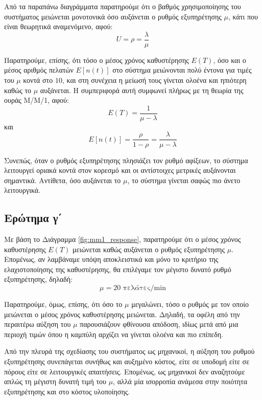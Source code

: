 \documentclass{article}
\begin{document}
Από τα παραπάνω διαγράμματα παρατηρούμε ότι ο βαθμός χρησιμοποίησης του
συστήματος μειώνεται μονοτονικά όσο αυξάνεται ο ρυθμός εξυπηρέτησης \(\mu\),
κάτι που είναι θεωρητικά αναμενόμενο, αφού:
\begin{equation}
U = \rho = \frac{\lambda}{\mu}
\end{equation}

Παρατηρούμε, επίσης, ότι τόσο ο μέσος χρόνος καθυστέρησης \(E(T)\), όσο και ο
μέσος αριθμός πελατών \(E[n(t)]\) στο σύστημα μειώνονται πολύ έντονα για τιμές
του \(\mu\) κοντά στο \(10\), και στη συνέχεια η μείωσή τους γίνεται ολοένα και
ηπιότερη καθώς το \(\mu\) αυξάνεται. Η συμπεριφορά αυτή συμφωνεί πλήρως με τη
θεωρία της ουράς Μ/Μ/1, αφού:
\begin{equation}
E(T) = \frac{1}{\mu - \lambda}
\end{equation}
και
\begin{equation}
E[n(t)] = \frac{\rho}{1-\rho} = \frac{\lambda}{\mu-\lambda}
\end{equation}

Συνεπώς, όταν ο ρυθμός εξυπηρέτησης πλησιάζει τον ρυθμό αφίξεων, το σύστημα
λειτουργεί οριακά κοντά στον κορεσμό και οι αντίστοιχες μετρικές αυξάνονται
σημαντικά. Αντίθετα, όσο αυξάνεται το \(\mu\), το σύστημα γίνεται σαφώς πιο
άνετο λειτουργικά.

\subsection{Ερώτημα γ΄}

Με βάση το Διάγραμμα \ref{fig:mm1_response}, παρατηρούμε ότι ο μέσος χρόνος
καθυστέρησης \(E(T)\) μειώνεται καθώς αυξάνεται ο ρυθμός εξυπηρέτησης
\(\mu\). Επομένως, αν λαμβάναμε υπόψη αποκλειστικά και μόνο το κριτήριο της
ελαχιστοποίησης της καθυστέρησης, θα επιλέγαμε τον μέγιστο δυνατό ρυθμό
εξυπηρέτησης, δηλαδή:
\begin{equation}
\mu = 20 \text{ πελάτες/min}
\end{equation}

Παρατηρούμε, όμως, επίσης, ότι όσο το \(\mu\) μεγαλώνει, τόσο ο ρυθμός με τον
οποίο μειώνεται ο μέσος χρόνος καθυστέρησης μειώνεται. Δηλαδή, τα οφέλη από
την περαιτέρω αύξηση του \(\mu\) παρουσιάζουν φθίνουσα απόδοση, ιδίως μετά
από μια περιοχή τιμών όπου η καμπύλη αρχίζει να γίνεται ολοένα και πιο επίπεδη.

Από την πλευρά της σχεδίασης του συστήματος ως μηχανικοί, η αύξηση του ρυθμού εξυπηρέτησης
συνεπάγεται συνήθως και αυξημένο κόστος, είτε σε υποδομή είτε σε πόρους είτε
σε λειτουργικές απαιτήσεις. Επομένως, ως μηχανικοί δεν αναζητούμε απλώς τη
μέγιστη δυνατή τιμή του \(\mu\), αλλά μία ισορροπία ανάμεσα στην ποιότητα
εξυπηρέτησης και στο κόστος υλοποίησης.
\end{document}
